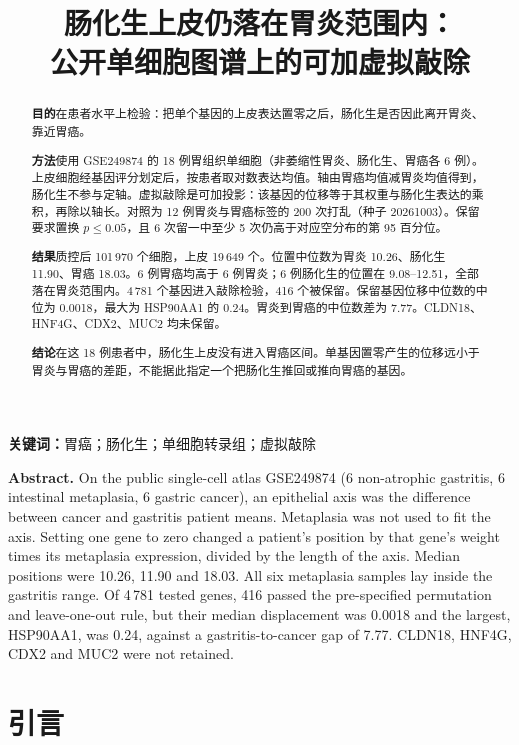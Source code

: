 \documentclass[12pt,a4paper,fontset=none]{ctexart}
\title{肠化生上皮仍落在胃炎范围内：\\公开单细胞图谱上的可加虚拟敲除}
\author{}
\date{}
\begin{document}
\maketitle

\begin{abstract}
\noindent\textbf{目的}\quad 在患者水平上检验：把单个基因的上皮表达置零之后，肠化生是否因此离开胃炎、靠近胃癌。

\noindent\textbf{方法}\quad 使用 GSE249874 的 18 例胃组织单细胞（非萎缩性胃炎、肠化生、胃癌各 6 例）。上皮细胞经基因评分划定后，按患者取对数表达均值。轴由胃癌均值减胃炎均值得到，肠化生不参与定轴。虚拟敲除是可加投影：该基因的位移等于其权重与肠化生表达的乘积，再除以轴长。对照为 12 例胃炎与胃癌标签的 200 次打乱（种子 20261003）。保留要求置换 \(p\le 0.05\)，且 6 次留一中至少 5 次仍高于对应空分布的第 95 百分位。

\noindent\textbf{结果}\quad 质控后 101\,970 个细胞，上皮 19\,649 个。位置中位数为胃炎 10.26、肠化生 11.90、胃癌 18.03。6 例胃癌均高于 6 例胃炎；6 例肠化生的位置在 9.08--12.51，全部落在胃炎范围内。4\,781 个基因进入敲除检验，416 个被保留。保留基因位移中位数的中位为 0.0018，最大为 HSP90AA1 的 0.24。胃炎到胃癌的中位数差为 7.77。CLDN18、HNF4G、CDX2、MUC2 均未保留。

\noindent\textbf{结论}\quad 在这 18 例患者中，肠化生上皮没有进入胃癌区间。单基因置零产生的位移远小于胃炎与胃癌的差距，不能据此指定一个把肠化生推回或推向胃癌的基因。
\end{abstract}

\textbf{关键词：}胃癌；肠化生；单细胞转录组；虚拟敲除

\vspace{0.6em}
\noindent\textbf{Abstract.} On the public single-cell atlas GSE249874 (6 non-atrophic gastritis, 6 intestinal metaplasia, 6 gastric cancer), an epithelial axis was the difference between cancer and gastritis patient means. Metaplasia was not used to fit the axis. Setting one gene to zero changed a patient's position by that gene's weight times its metaplasia expression, divided by the length of the axis. Median positions were 10.26, 11.90 and 18.03. All six metaplasia samples lay inside the gastritis range. Of 4\,781 tested genes, 416 passed the pre-specified permutation and leave-one-out rule, but their median displacement was 0.0018 and the largest, HSP90AA1, was 0.24, against a gastritis-to-cancer gap of 7.77. CLDN18, HNF4G, CDX2 and MUC2 were not retained.

\section{引言}
\end{document}
